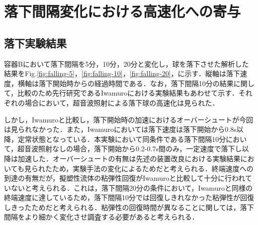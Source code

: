 \section{落下間隔変化における高速化への寄与}
\subsection{落下実験結果}

容器Bにおいて落下間隔を5分，10分，20分と変化し，球を落下させた解析した結果をFig.\ref{fig:falling-5}，\ref{fig:falling-10}，\ref{fig:falling-20}，に示す．縦軸は落下速度，横軸は落下開始時からの経過時間である．なお，落下間隔10分の結果に関して，比較のため先行研究であるIwamuro\cite{ref:9}における実験結果もあわせて示す．それぞれの場合において，超音波照射による落下球の高速化は見られた．

しかし，Iwamuro\cite{ref:9}と比較し，落下開始時の加速におけるオーバーシュートが今回は見られなかった．また，Iwamuro\cite{ref:9}においては落下速度は落下開始から0.8s以降，定常状態となっている．本実験において同条件である落下間隔10分において，超音波照射なしの場合，落下開始から0.2-0.7s間のみ，一定速度で落下し以降は加速した．オーバーシュートの有無は先述の装置改良における実験結果においても見られたため，実験手法の変化によるためだと考えられる．終端速度への到達の有無だが，擬塑性流体の粘弾性回復がIwamuro\cite{ref:9}と比較して十分に行われていないと考えられる．これは，落下間隔20分の条件において，Iwamuro\cite{ref:9}と同様の終端速度に達しているため，落下間隔10分では回復しきれなかった粘弾性が回復しきったためだと考えられる．粘弾性の回復時間が異なることに関しては，落下間隔をより細かく変化させ調査する必要があると考えられる．

